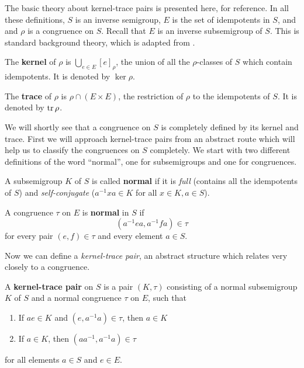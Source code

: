 The basic theory about kernel-trace pairs is presented here, for reference.  In
all these definitions, $S$ is an inverse semigroup, $E$ is the set of
idempotents in $S$, and and $\rho$ is a congruence on $S$.  Recall that $E$ is
an inverse subsemigroup of $S$.  This is standard background theory, which is
adapted from \cite[\S 5.3]{howie}.

\begin{definition}
  \label{def:kernel}
  The \textbf{kernel} of $\rho$ is $\bigcup_{e \in E} [e]_\rho$, the union of
  all the $\rho$-classes of $S$ which contain idempotents.  It is denoted by
  $\ker\rho$.
\end{definition}

\begin{definition}
  \label{def:trace}
  The \textbf{trace} of $\rho$ is $\rho \cap (E \times E)$, the restriction of
  $\rho$ to the idempotents of $S$.  It is denoted by $\operatorname{tr}\rho$.
\end{definition}

We will shortly see that a congruence on $S$ is completely defined by its kernel
and trace.  First we will approach kernel-trace pairs from an abstract route
which will help us to classify the congruences on $S$ completely.  We start with
two different definitions of the word ``normal'', one for subsemigroups and one
for congruences.

\begin{definition}
  \label{def:kernel-normal}
  A subsemigroup $K$ of $S$ is called \textbf{normal} if it is
  \textit{full} (contains all the idempotents of $S$) and
  \textit{self-conjugate} ($a^{-1}xa \in K$ for all $x \in K, a \in S$).
\end{definition}

\begin{definition}
  \label{def:trace-normal}
  A congruence $\tau$ on $E$ is \textbf{normal} in $S$ if
  $$(a^{-1}ea,a^{-1}fa) \in \tau$$
  for every pair $(e,f) \in \tau$ and every element $a \in S$.
\end{definition}

Now we can define a \textit{kernel-trace pair}, an abstract structure which
relates very closely to a congruence.

\begin{definition}
  \label{def:kernel-trace-pair}
  A \textbf{kernel-trace pair} on $S$ is a pair $(K,\tau)$ consisting of a
  normal subsemigroup $K$ of $S$ and a normal congruence $\tau$ on $E$, such
  that
  \begin{enumerate}[\rm(1)]
  \item If $ae \in K$ and $(e,a^{-1}a) \in \tau$, then $a \in K$
  \item If $a \in K$, then $(aa^{-1},a^{-1}a) \in \tau$
  \end{enumerate}
  for all elements $a \in S$ and $e \in E$.
\end{definition}

